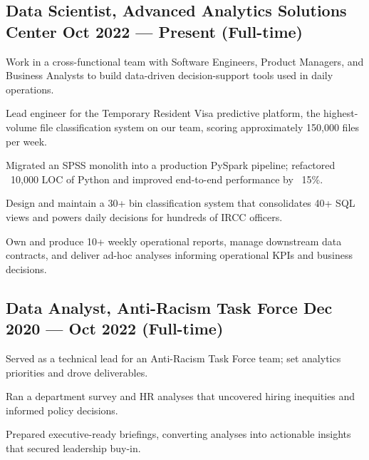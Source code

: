 \subsection{{Data Scientist, Advanced Analytics Solutions Center \hfill Oct 2022 --- Present (Full-time)}}
\begin{zitemize}
    \setlength\itemsep{0.4em}
    \item Work in a cross-functional team with Software Engineers, Product Managers, and Business Analysts to build data-driven decision-support tools used in daily operations.
    \item Lead engineer for the Temporary Resident Visa predictive platform, the highest-volume file classification system on our team, scoring approximately 150{,}000 files per week.
    \item Migrated an SPSS monolith into a production PySpark pipeline; refactored ~10{,}000 LOC of Python and improved end-to-end performance by ~15\%.
    \item Design and maintain a 30+ bin classification system that consolidates 40+ SQL views and powers daily decisions for hundreds of IRCC officers.
    \item Own and produce 10+ weekly operational reports, manage downstream data contracts, and deliver ad-hoc analyses informing operational KPIs and business decisions.
\end{zitemize}
\vspace{0.75em}

\subsection{{Data Analyst, Anti-Racism Task Force \hfill Dec 2020 --- Oct 2022 (Full-time)}}
\begin{zitemize}
    \setlength\itemsep{0.4em}
    \item Served as a technical lead for an Anti-Racism Task Force team; set analytics priorities and drove deliverables.
    \item Ran a department survey and HR analyses that uncovered hiring inequities and informed policy decisions.
    \item Prepared executive-ready briefings, converting analyses into actionable insights that secured leadership buy-in.
\end{zitemize}
\vspace{0.75em}

